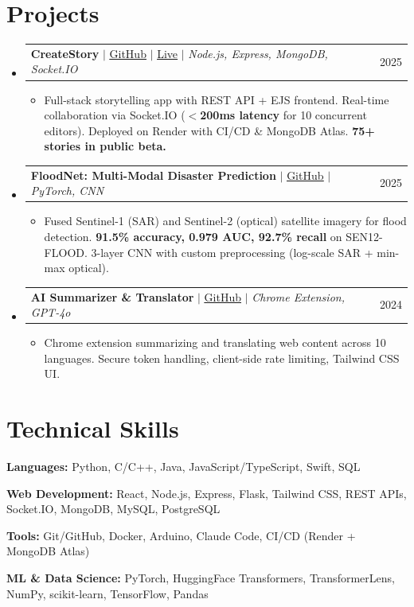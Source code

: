 \documentclass[letterpaper,11pt]{article}
\makeatletter
\newcommand{\resumeItem}[1]{\item\small{#1\vspace{-2pt}}}
\newcommand{\resumeProjectHeading}[2]{
    \item
    \begin{tabular*}{0.97\textwidth}{l@{\extracolsep{\fill}}r}
      \small#1 & #2 \\
    \end{tabular*}\vspace{-6pt}
}
\newcommand{\resumeSubHeadingListStart}{\begin{itemize}[leftmargin=0.15in, label={}]}
\newcommand{\resumeSubHeadingListEnd}{\end{itemize}}
\newcommand{\resumeItemListStart}{\begin{itemize}[leftmargin=0.15in, label=\textbullet, itemsep=-2pt, topsep=0pt]}
\newcommand{\resumeItemListEnd}{\end{itemize}\vspace{-4pt}}
\makeatother
\begin{document}
\section{Projects}
\resumeSubHeadingListStart
  \resumeProjectHeading
    {\textbf{CreateStory} $|$ \href{https://github.com/Avi161/CreateStory}{\underline{GitHub}} $|$ \href{https://createstory.onrender.com/}{\underline{Live}} $|$ \textit{Node.js, Express, MongoDB, Socket.IO}}{2025}
    \resumeItemListStart
      \resumeItem{Full-stack storytelling app with REST API + EJS frontend. Real-time collaboration via Socket.IO (\textbf{$<$200ms latency} for 10 concurrent editors). Deployed on Render with CI/CD \& MongoDB Atlas. \textbf{75+ stories in public beta.}}
    \resumeItemListEnd
  \resumeProjectHeading
    {\textbf{FloodNet: Multi-Modal Disaster Prediction} $|$ \href{https://github.com/Avi161/AI4ALL-5A}{\underline{GitHub}} $|$ \textit{PyTorch, CNN}}{2025}
    \resumeItemListStart
      \resumeItem{Fused Sentinel-1 (SAR) and Sentinel-2 (optical) satellite imagery for flood detection. \textbf{91.5\% accuracy, 0.979 AUC, 92.7\% recall} on SEN12-FLOOD. 3-layer CNN with custom preprocessing (log-scale SAR + min-max optical).}
    \resumeItemListEnd
  \resumeProjectHeading
    {\textbf{AI Summarizer \& Translator} $|$ \href{https://github.com/Avi161/AI-Summariser-and-Translator}{\underline{GitHub}} $|$ \textit{Chrome Extension, GPT-4o}}{2024}
    \resumeItemListStart
      \resumeItem{Chrome extension summarizing and translating web content across 10 languages. Secure token handling, client-side rate limiting, Tailwind CSS UI.}
    \resumeItemListEnd
\resumeSubHeadingListEnd

\section{Technical Skills}
\begin{itemize}[leftmargin=0.15in, label={}, itemsep=-3pt]
  \small{
    \item{\textbf{Languages:} Python, C/C++, Java, JavaScript/TypeScript, Swift, SQL}
    \item{\textbf{Web Development:} React, Node.js, Express, Flask, Tailwind CSS, REST APIs, Socket.IO, MongoDB, MySQL, PostgreSQL}
    \item{\textbf{Tools:} Git/GitHub, Docker, Arduino, Claude Code, CI/CD (Render + MongoDB Atlas)}
    \item{\textbf{ML \& Data Science:} PyTorch, HuggingFace Transformers, TransformerLens, NumPy, scikit-learn, TensorFlow, Pandas}
  }
\end{itemize}
\end{document}
